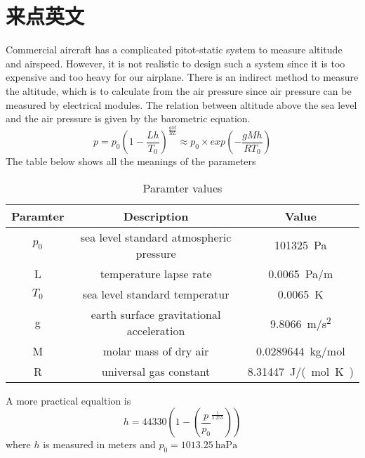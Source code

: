 \chapter{来点英文}
    Commercial aircraft has a complicated pitot-static system to measure altitude and airspeed. However, it is not realistic to design such a system since it is too expensive and too heavy for our airplane. There is an indirect method to measure the altitude, which is to calculate from the air pressure since air pressure can be measured by electrical modules. The relation between altitude above the sea level and the air pressure is given by the barometric equation.\cite{rfc952}
    \begin{equation}
        p=p_0(1-\frac{Lh}{T_0})^{\frac{gM}{RL}}\approx p_0\times exp(-\frac{gMh}{RT_0})
        \label{equ:baro}
    \end{equation}
    The table below shows all the meanings of the parameters
    \begin{table}[ht]
        \caption{Paramter values}
        \centering
        \begin{tabular}[l]{c c c}
            \hline\hline
            Paramter & Description & Value\\
            \hline
            $p_0$   & sea level standard atmospheric pressure   & \SI{101325}{\pascal}\\
            L       & temperature lapse rate                    & \SI{0.0065}{\pascal/\metre}\\
            $T_0$   & sea level standard temperatur             & \SI{0.0065}{\kelvin}\\
            g       & earth surface gravitational acceleration  & \SI{9.8066}{\metre/\second\squared}\\
            M       & molar mass of dry air                     & \SI{0.0289644}{\kilogram/\mole}\\
            R       & universal gas constant                    & \SI{8.31447}{\joule/(\mole.\kelvin)}\\
            \hline
        \end{tabular}
        \label{table:baro}
    \end{table}

    A more practical equaltion is
    \begin{equation}
        h=44330(1-(\frac{p}{p_0}^{\frac{1}{5.255}}))
    \end{equation}
    where $h$ is measured in meters and $p_0=\SI{1013.25}{\hectare\pascal}$
